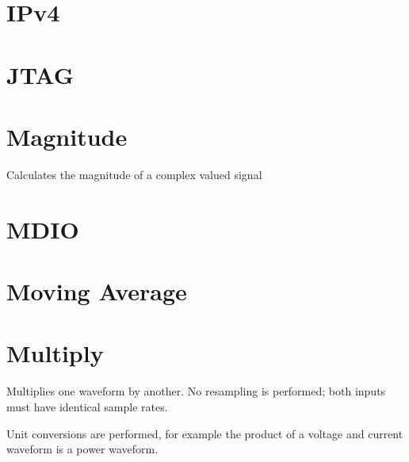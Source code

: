 \pagebreak
\section{IPv4}

\pagebreak
\section{JTAG}

\pagebreak
\section{Magnitude}

Calculates the magnitude of a complex valued signal

\pagebreak
\section{MDIO}

\pagebreak
\section{Moving Average}

\pagebreak
\section{Multiply}

Multiplies one waveform by another. No resampling is performed; both inputs must have identical sample rates.

Unit conversions are performed, for example the product of a voltage and current waveform is a power waveform.

\pagebreak
